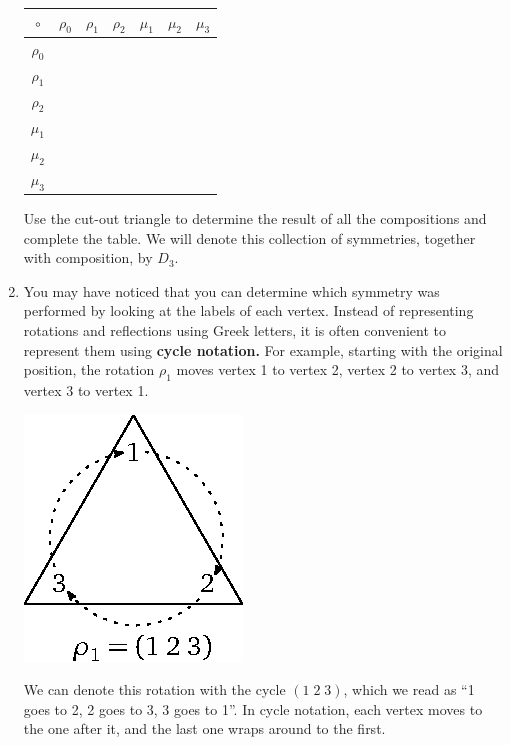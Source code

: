 \begin{enumerate}
    \begin{center}
  \renewcommand{\arraystretch}{1.7}
    \begin{tabular}{|c||c|c|c|c|c|c|} \hline
        $\circ$ & $\rho_0$ & $\rho_1$ & $\rho_2$ & $\mu_1$ & $\mu_2$ & $\mu_3$ \\ \hline \hline
        $\rho_0$ & & & & & & \\ \hline
        $\rho_1$ & & & & & & \\ \hline
        $\rho_2$ & & & & & & \\ \hline
        $\mu_1$ & & & & & & \\ \hline
        $\mu_2$ & & & & & & \\ \hline
        $\mu_3$ & & & & & & \\ \hline
    \end{tabular}
    \end{center}

    Use the cut-out triangle to determine the result of all the compositions and complete the table. We will denote this collection of symmetries, together with composition, by $D_3$.

    \item You may have noticed that you can determine which symmetry was performed by looking at the labels of each vertex. Instead of representing rotations and reflections using Greek letters, it is often convenient to represent them using \textbf{cycle notation.} For example, starting with the original position, the rotation $\rho_1$ moves vertex 1 to vertex 2, vertex 2 to vertex 3, and vertex 3 to vertex 1.
    \begin{center}
        \includegraphics{d3cycles.eps}
    \end{center}
We can denote this rotation with the cycle $(1\; 2\; 3)$, which we read as ``1 goes to 2, 2 goes to 3, 3 goes to 1''. In cycle notation, each vertex moves to the one after it, and the last one wraps around to the first.


\end{enumerate}
